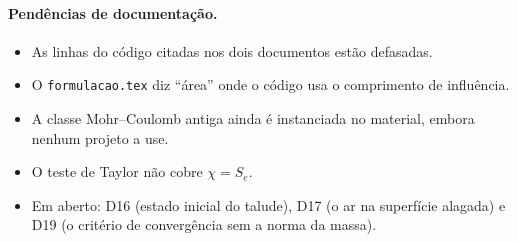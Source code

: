 \paragraph{Pendências de documentação.}
\begin{itemize}
  \item As linhas do código citadas nos dois documentos estão defasadas.
  \item O \texttt{formulacao.tex} diz ``área'' onde o código usa o comprimento de influência.
  \item A classe Mohr--Coulomb antiga ainda é instanciada no material, embora nenhum projeto a use.
  \item O teste de Taylor não cobre $\chi = S_e$.
  \item Em aberto: D16 (estado inicial do talude), D17 (o ar na superfície alagada) e D19 (o critério de convergência
    sem a norma da massa).
\end{itemize}

